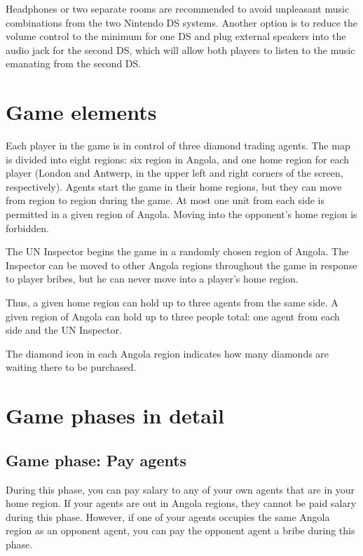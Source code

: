 \documentclass[8pt]{extbook}
\begin{document}
Headphones or two separate rooms are recommended to avoid unpleasant music combinations from the two Nintendo DS systems.  Another option is to reduce the volume control to the minimum for one DS and plug external speakers into the audio jack for the second DS, which will allow both players to listen to the music emanating from the second DS.









\section{Game elements}

Each player in the game is in control of three diamond trading agents.  The map is divided into eight regions:  six region in Angola, and one home region for each player (London and Antwerp, in the upper left and right corners of the screen, respectively).  Agents start the game in their home regions, but they can move from region to region during the game.  At most one unit from each side is permitted in a given region of Angola.  Moving into the opponent's home region is forbidden.

The UN Inspector begins the game in a randomly chosen region of Angola.  The Inspector can be moved to other Angola regions throughout the game in response to player bribes, but he can never move into a player's home region.

Thus, a given home region can hold up to three agents from the same side.  A given region of Angola can hold up to three people total:  one agent from each side and the UN Inspector.

The diamond icon in each Angola region indicates how many diamonds are waiting there to be purchased.




\section{Game phases in detail}

\subsection{Game phase:  Pay agents}
\label{sec:payPhase}

During this phase, you can pay salary to any of your own agents that are in your home region.  If your agents are out in Angola regions, they cannot be paid salary during this phase.  However, if one of your agents occupies the same Angola region as an opponent agent, you can pay the opponent agent a bribe during this phase.
\end{document}
